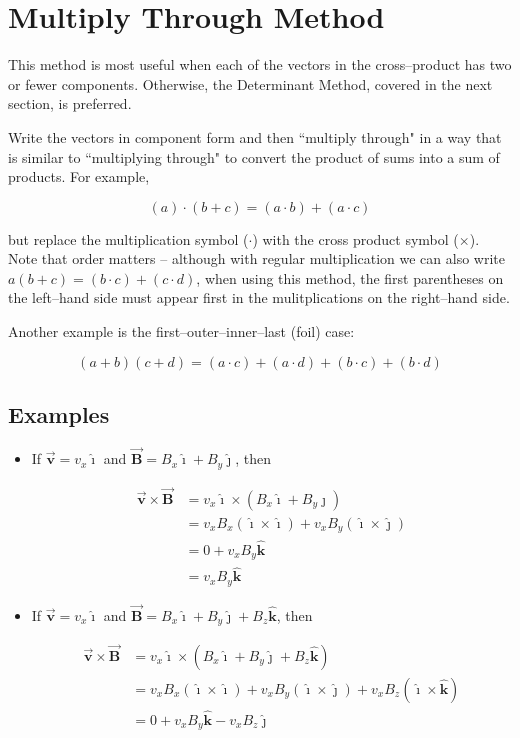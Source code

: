 \documentclass{article}
\newcommand{\ihat}[0]{\hat{\boldsymbol{\imath}}}
\newcommand{\jhat}[0]{\hat{\boldsymbol{\jmath}}}
\newcommand{\khat}[0]{\hat{\boldsymbol{k}}}
\newcommand{\bfvec}[1]{\vec{\mathbf{#1}}}
\begin{document}
\section{Multiply Through Method}

This method is most useful when each of the vectors in the cross--product has two or fewer components. Otherwise, the Determinant Method, covered in the next section, is preferred.

Write the vectors in component form and then ``multiply through" in a way that is similar to ``multiplying through" to convert the product of sums into a sum of products. For example,

$$(a)\cdot(b+c) = (a\cdot b) + (a\cdot c)$$

but replace the multiplication symbol ($\cdot$) with the cross product symbol ($\times$). Note that order matters -- although with regular multiplication we can also write $a(b+c) = (b\cdot c) + (c\cdot d)$, when using this method, the first parentheses on the left--hand side must appear first in the mulitplications on the right--hand side.

Another example is the first--outer--inner--last (foil) case:

$$(a+b)(c+d)=(a\cdot c) + (a\cdot d) + (b\cdot c) + (b\cdot d)$$

\subsection{Examples}

\begin{itemize}

  \item If $\bfvec{v}=v_x\ihat$ and $\bfvec{B}=B_x\ihat+B_y\jhat$, then

        $$
        \begin{align*}
        \bfvec{v}\times\bfvec{B} &= v_x\ihat\times(B_x\ihat+B_y\jhat)\\
        &= v_xB_x(\ihat\times\ihat) + v_xB_y(\ihat\times\jhat)\\
        &= 0 + v_xB_y\khat\\
        &= v_xB_y\khat
        \end{align*}
        $$

  \item If $\bfvec{v}=v_x\ihat$ and $\bfvec{B}=B_x\ihat+B_y\jhat + B_z\khat$, then

        $$
        \begin{align*}
        \bfvec{v}\times\bfvec{B} &= v_x\ihat\times(B_x\ihat+B_y\jhat+B_z\khat) \\
        & = v_xB_x(\ihat\times\ihat) + v_xB_y(\ihat\times\jhat) + v_xB_z(\ihat\times\khat)\\
        & = 0 + v_xB_y\khat - v_xB_z\jhat
        \end{align*}
        $$

\end{itemize}
\end{document}
